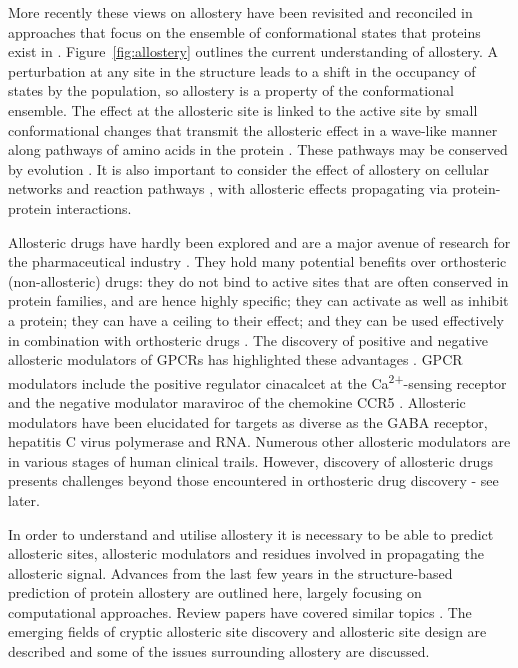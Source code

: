 More recently these views on allostery have been revisited and reconciled in approaches that focus on the ensemble of conformational states that proteins exist in \cite{Motlagh2014, Hilser2012, Cui2008, Tsai2014}.
Figure~\ref{fig:allostery} outlines the current understanding of allostery.
A perturbation at any site in the structure leads to a shift in the occupancy of states by the population, so allostery is a property of the conformational ensemble.
The effect at the allosteric site is linked to the active site by small conformational changes that transmit the allosteric effect in a wave-like manner along pathways of amino acids in the protein \cite{DelSol2009}.
These pathways may be conserved by evolution \cite{Suel2003}.
It is also important to consider the effect of allostery on cellular networks and reaction pathways \cite{Nussinov2013}, with allosteric effects propagating via protein-protein interactions.

Allosteric drugs have hardly been explored and are a major avenue of research for the pharmaceutical industry \cite{Wenthur2014}.
They hold many potential benefits over orthosteric (non-allosteric) drugs: they do not bind to active sites that are often conserved in protein families, and are hence highly specific; they can activate as well as inhibit a protein; they can have a ceiling to their effect; and they can be used effectively in combination with orthosteric drugs \cite{Wenthur2014}.
The discovery of positive and negative allosteric modulators of GPCRs has highlighted these advantages \cite{Wootten2013, Conn2009}.
GPCR modulators include the positive regulator cinacalcet at the Ca\textsuperscript{2+}-sensing receptor and the negative modulator maraviroc of the chemokine CCR5 \cite{Nussinov2013}.
Allosteric modulators have been elucidated for targets as diverse as the GABA receptor, hepatitis C virus polymerase and RNA.
Numerous other allosteric modulators are in various stages of human clinical trails.
However, discovery of allosteric drugs presents challenges beyond those encountered in orthosteric drug discovery - see later.

In order to understand and utilise allostery it is necessary to be able to predict allosteric sites, allosteric modulators and residues involved in propagating the allosteric signal.
Advances from the last few years in the structure-based prediction of protein allostery are outlined here, largely focusing on computational approaches.
Review papers have covered similar topics \cite{SchuelerFurman2016, Wagner2016, Guarnera2016, Lu2014}.
The emerging fields of cryptic allosteric site discovery and allosteric site design are described and some of the issues surrounding allostery are discussed.


